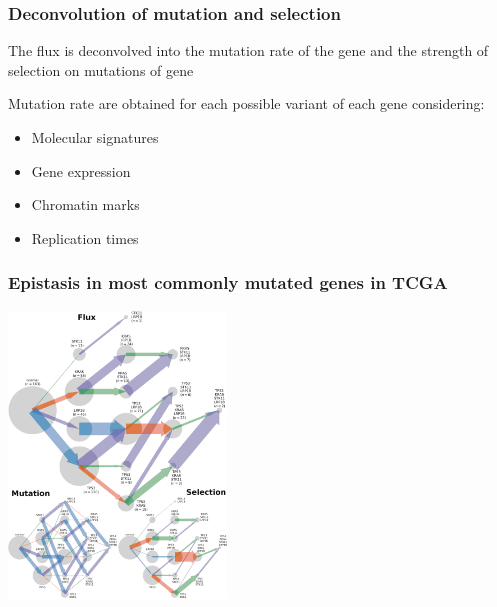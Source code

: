 \documentclass{beamer}
\newenvironment{itemize+}{\begin{itemize}[<+->]}{\end{itemize}}
\begin{document}
\begin{frame}
  \frametitle{Deconvolution of mutation and selection}
  \begin{itemize+}
  \item The flux is deconvolved into the mutation rate of the gene and
    the strength of selection on mutations of gene
  \item Mutation rate are obtained for each possible variant of each
    gene considering:
    \begin{itemize}
    \item Molecular signatures
    \item Gene expression
    \item Chromatin marks
    \item Replication times
    \end{itemize}
  \end{itemize+}
\end{frame}


\begin{frame}
  \frametitle{Epistasis in most commonly mutated genes in TCGA}
  \begin{center}
    \includegraphics[height=3in]{all_landscapes_luad_4_sf}
  \end{center}
\end{frame}
\end{document}
